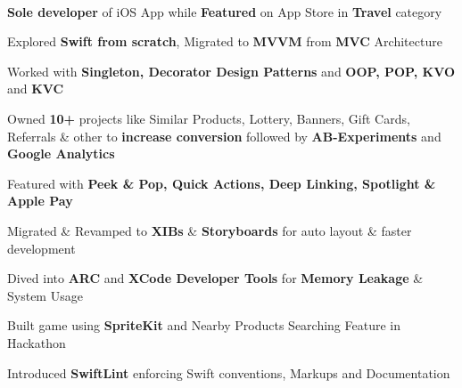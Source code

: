 \documentclass[]{Kauts}
\begin{document}
\begin{minipage}[t]{0.69\textwidth}
\\
\begin{tightemize}
\item \textbf{Sole developer} of iOS App while \textbf{Featured} on App Store in \textbf{Travel} category\\
\item Explored \textbf{Swift from scratch}, Migrated to \textbf{MVVM} from \textbf{MVC} Architecture\\
\item Worked with \textbf{Singleton, Decorator Design Patterns} and \textbf{OOP, POP, KVO} and \textbf{KVC}\\
\item Owned \textbf{10+} projects like Similar Products, Lottery, Banners, Gift Cards, Referrals \& other to \textbf{increase conversion} followed by \textbf{AB-Experiments} and \textbf{Google Analytics}\\
\item Featured with \textbf{Peek \& Pop, Quick Actions, Deep Linking, Spotlight \& Apple Pay}\\
\item Migrated \& Revamped to \textbf{XIBs} \& \textbf{Storyboards} for auto layout \& faster development\\
\item Dived into \textbf{ARC} and \textbf{XCode Developer Tools} for \textbf{Memory Leakage} \& System Usage\\
\item Built game using \textbf{SpriteKit} and Nearby Products Searching Feature in Hackathon\\
\item Introduced \textbf{SwiftLint} enforcing Swift conventions, Markups and Documentation\\
\end{tightemize}
\sectionsep


\end{minipage}
\end{document}

